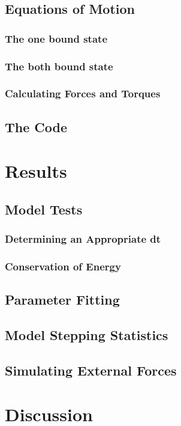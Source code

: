 \documentclass[a4paper, 11pt]{article}
\begin{document}
	\subsection{Equations of Motion}
		\subsubsection{The one bound state}
		\subsubsection{The both bound state}
		\subsubsection{Calculating Forces and Torques}
	\subsection{The Code}

\section{Results}
	\subsection{Model Tests}
		\subsubsection{Determining an Appropriate dt}
		\subsubsection{Conservation of Energy}
	\subsection{Parameter Fitting}
	\subsection{Model Stepping Statistics}
	\subsection{Simulating External Forces}

\section{Discussion}
\end{document}
